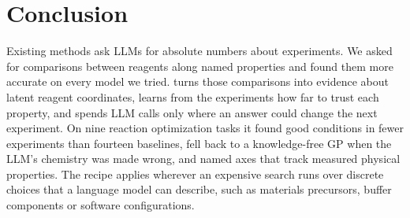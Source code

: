 \section{Conclusion}
\label{sec:conclusion}

Existing methods ask LLMs for absolute numbers about experiments. We asked for comparisons between reagents along named properties and found them more accurate on every model we tried. \ours{} turns those comparisons into evidence about latent reagent coordinates, learns from the experiments how far to trust each property, and spends LLM calls only where an answer could change the next experiment. On nine reaction optimization tasks it found good conditions in fewer experiments than fourteen baselines, fell back to a knowledge-free GP when the LLM's chemistry was made wrong, and named axes that track measured physical properties. The recipe applies wherever an expensive search runs over discrete choices that a language model can describe, such as materials precursors, buffer components or software configurations.
